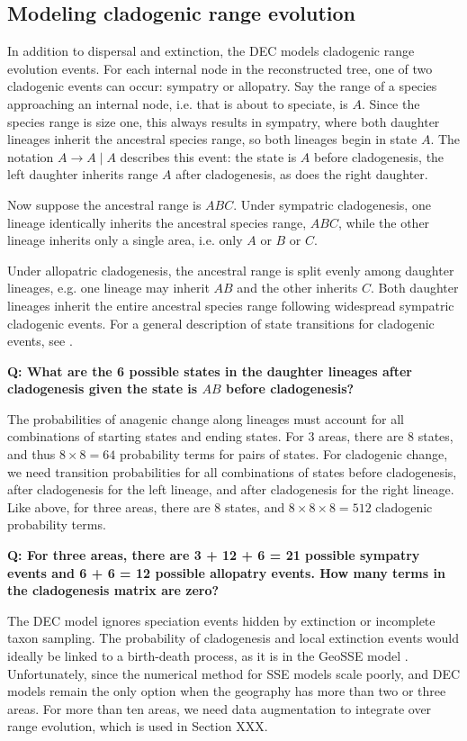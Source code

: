 \subsection{Modeling cladogenic range evolution}

In addition to dispersal and extinction, the DEC models cladogenic range evolution events.
For each internal node in the reconstructed tree, one of two cladogenic events can occur: sympatry or allopatry.
Say the range of a species approaching an internal node, i.e. that is about to speciate, is $A$.
Since the species range is size one, this always results in sympatry, where both daughter lineages inherit the ancestral species range, so both lineages begin in state $A$.
The notation $A \rightarrow A \mid A$ describes this event: the state is $A$ before cladogenesis, the left daughter inherits range $A$ after cladogenesis, as does the right daughter.

Now suppose the ancestral range is $ABC$.
Under sympatric cladogenesis, one lineage identically inherits the ancestral species range, $ABC$, while the other lineage inherits only a single area, i.e. only $A$ or $B$ or $C$.

Under allopatric cladogenesis, the ancestral range is split evenly among daughter lineages, e.g. one lineage may inherit $AB$ and the other inherits $C$.
Both daughter lineages inherit the entire ancestral species range following widespread sympatric cladogenic events.
For a general description of state transitions for cladogenic events, see \citet{matzke13}.

{\bf Q: What are the 6 possible states in the daughter lineages after cladogenesis given the state is $AB$ before cladogenesis?}

The probabilities of anagenic change along lineages must account for all combinations of starting states and ending states.
For 3 areas, there are 8 states, and thus $8 \times 8 = 64$ probability terms for pairs of states.
For cladogenic change, we need transition probabilities for all combinations of states before cladogenesis, after cladogenesis for the left lineage, and after cladogenesis for the right lineage.
Like above, for three areas, there are 8 states, and $8 \times 8 \times 8 = 512$ cladogenic probability terms.

{\bf Q: For three areas, there are 3 + 12 + 6 = 21 possible sympatry events and 6 + 6 = 12 possible allopatry events. How many terms in the cladogenesis matrix are zero?}

The DEC model ignores speciation events hidden by extinction or incomplete taxon sampling.
The probability of cladogenesis and local extinction events would ideally be linked to a birth-death process, as it is in the GeoSSE model \citep{goldberg11}.
Unfortunately, since the numerical method for SSE models scale poorly, and DEC models remain the only option when the geography has more than two or three areas.
For more than ten areas, we need data augmentation to integrate over range evolution, which is used in Section XXX.

